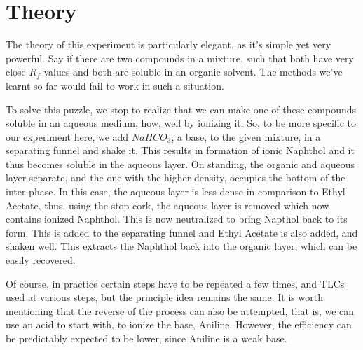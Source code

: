 \section{Theory}
	The theory of this experiment is particularly elegant, as it's simple yet very powerful. Say if there are two compounds in a mixture, such that both have very close $R_f$ values and both are soluble in an organic solvent. The methods we've learnt so far would fail to work in such a situation.
	\par
	To solve this puzzle, we stop to realize that we can make one of these compounds soluble in an aqueous medium, how, well by ionizing it. So, to be more specific to our experiment here, we add $NaHCO_3$, a base, to the given mixture, in a separating funnel and shake it. This results in formation of ionic Naphthol and it thus becomes soluble in the aqueous layer. On standing, the organic and aqueous layer separate, and the one with the higher density, occupies the bottom of the inter-phase. In this case, the aqueous layer is less dense in comparison to Ethyl Acetate, thus, using the stop cork, the aqueous layer is removed which now contains ionized Naphthol. This is now neutralized to bring Napthol back to its form. This is added to the separating funnel and Ethyl Acetate is also added, and shaken well. This extracts the Naphthol back into the organic layer, which can be easily recovered.
	\par
	Of course, in practice certain steps have to be repeated a few times, and TLCs used at various steps, but the principle idea remains the same. It is worth mentioning that the reverse of the process can also be attempted, that is, we can use an acid to start with, to ionize the base, Aniline. However, the efficiency can be predictably expected to be lower, since Aniline is a weak base.


